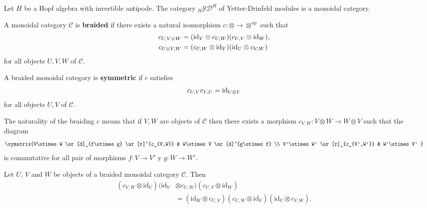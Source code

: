 \begin{example}
Let $H$ be a Hopf algebra with invertible antipode. The category
$_H\mathcal{YD}^H$ of Yetter-Drinfeld modules is a monoidal category. 
\end{example}


\begin{definition}
A monoidal category $\mathcal{C}$ is \textbf{braided} if there
exists a natural isomorphism $c:\otimes\to\otimes^{\mathrm{op}}$
such that
\begin{align}
c_{U,V\otimes W} & =(\id_{V}\otimes c_{U,W})(c_{U,V}\otimes\id_{W}),\label{eq:braided1}\\
c_{U\otimes V,W} & =(c_{U,W}\otimes\id_{V})(\id_{U}\otimes c_{V,W})\label{eq:braided2}
\end{align}
for all objects $U,V,W$ of $\mathcal{C}$. 
\end{definition}

\begin{definition}
A braided monoidal category is \textbf{symmetric} if $c$ satisfies
\[
c_{U,V}c_{V,U}=\mathrm{id}_{U\otimes V}
\]
for all objects $U,V$ of $\mathcal{C}$.
\end{definition}

\begin{remark}
The naturality of the braiding $c$ means that if $V,W$ are objects
of $\mathcal{C}$ then there exists a morphism $c_{V,W}:V\otimes W\to W\otimes V$
such that the diagram 
\[
\xymatrix{V\otimes W \ar[d]_{f\otimes g} \ar[r]^{c_{V,W}} & W\otimes V \ar[d]^{g\otimes f} \\ V'\otimes W' \ar[r]_{c_{V',W'}} & W'\otimes V' }
\]
is commutative for all pair of morphisms $f:V\to V'$ y $g:W\to W'$.
\end{remark}

\begin{proposition}
Let $U$, $V$ and $W$ be objects of a braided monoidal category $\mathcal{C}$.
Then 
\begin{align*}
(c_{V,W}\otimes\textrm{id}_{U})(\textrm{id}_{V}&\otimes c_{U,W})(c_{U,V}\otimes\textrm{id}_{W})\\
&=(\textrm{id}_{W}\otimes c_{U,V})(c_{U,W}\otimes\textrm{id}_{V})(\textrm{id}_{U}\otimes c_{V,W}).
\end{align*}
\end{proposition}

